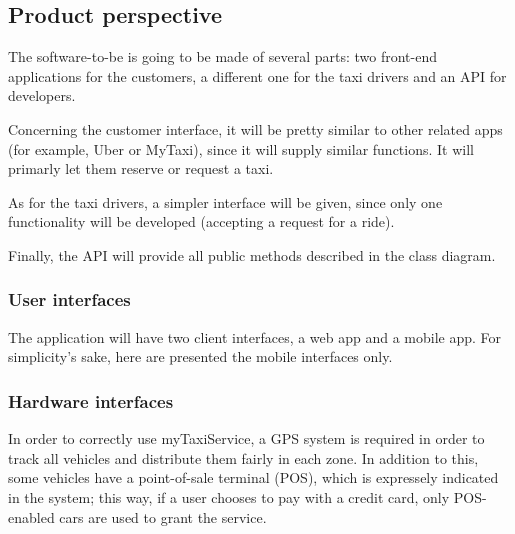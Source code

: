 \pagebreak
\subsection{Product perspective}

The software-to-be is going to be made of several parts: two front-end applications for the customers, a different one for the taxi drivers and an API for developers. 

Concerning the customer interface, it will be pretty similar to other related apps (for example, Uber or MyTaxi), since it will supply similar functions. It will primarly let them reserve or request a taxi.

As for the taxi drivers, a simpler interface will be given, since only one functionality will be developed (accepting a request for a ride).

Finally, the API will provide all public methods described in the class diagram. %
 
\subsubsection{User interfaces}
The application will have two client interfaces, a web app and a mobile app. For simplicity's sake, here are presented the mobile interfaces only.

\pagebreak
{}





\pagebreak
\subsubsection{Hardware interfaces}
In order to correctly use myTaxiService, a GPS system is required in order to track all vehicles and distribute them fairly in each zone. In addition to this, some vehicles have a point-of-sale terminal (POS), which is expressely indicated in the system; this way, if a user chooses to pay with a credit card, only POS-enabled cars are used to grant the service.

